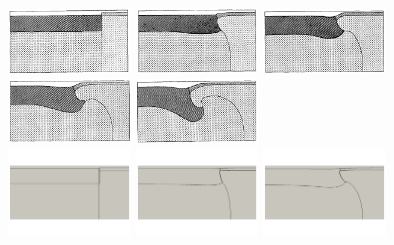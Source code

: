 \begin{center}
\includegraphics[width=3.25cm]{python_codes/fieldstone_118/images/case1/a}
\includegraphics[width=3.25cm]{python_codes/fieldstone_118/images/case1/b}
\includegraphics[width=3.25cm]{python_codes/fieldstone_118/images/case1/c}
\includegraphics[width=3.25cm]{python_codes/fieldstone_118/images/case1/d}
\includegraphics[width=3.25cm]{python_codes/fieldstone_118/images/case1/e}\\
\includegraphics[width=3.25cm]{python_codes/fieldstone_118/results/case1/a}
\includegraphics[width=3.25cm]{python_codes/fieldstone_118/results/case1/b}
\includegraphics[width=3.25cm]{python_codes/fieldstone_118/results/case1/c}

\end{center}

